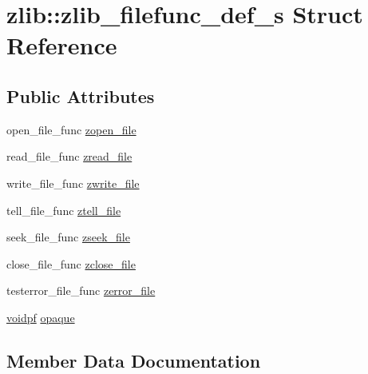\hypertarget{structzlib_1_1zlib__filefunc__def__s}{}\section{zlib\+:\+:zlib\+\_\+filefunc\+\_\+def\+\_\+s Struct Reference}
\label{structzlib_1_1zlib__filefunc__def__s}
\subsection*{Public Attributes}
\begin{DoxyCompactItemize}
\item 
open\+\_\+file\+\_\+func \hyperlink{structzlib_1_1zlib__filefunc__def__s_a86f77bf0dcbca7f7c93eeef0c3dc5e3f}{zopen\+\_\+file}
\item 
read\+\_\+file\+\_\+func \hyperlink{structzlib_1_1zlib__filefunc__def__s_a9711e81c84baecbd5e3cee927d80e9d5}{zread\+\_\+file}
\item 
write\+\_\+file\+\_\+func \hyperlink{structzlib_1_1zlib__filefunc__def__s_a88245281ce2bbc17b64cc53de3b2aa48}{zwrite\+\_\+file}
\item 
tell\+\_\+file\+\_\+func \hyperlink{structzlib_1_1zlib__filefunc__def__s_a415f4021bb24d58c90f975af1c895f5e}{ztell\+\_\+file}
\item 
seek\+\_\+file\+\_\+func \hyperlink{structzlib_1_1zlib__filefunc__def__s_a401a47099ede7b599fa15d5bb6fcf7be}{zseek\+\_\+file}
\item 
close\+\_\+file\+\_\+func \hyperlink{structzlib_1_1zlib__filefunc__def__s_a6f3390ecaead72d856e1a4c34189137c}{zclose\+\_\+file}
\item 
testerror\+\_\+file\+\_\+func \hyperlink{structzlib_1_1zlib__filefunc__def__s_a56fe4b30136ffef281c9619b42cd0919}{zerror\+\_\+file}
\item 
\hyperlink{namespacezlib_a2bc9778594c329ce309c43185bc3f9eb}{voidpf} \hyperlink{structzlib_1_1zlib__filefunc__def__s_a7939d028329be9b332d7f6f9da9165f6}{opaque}
\end{DoxyCompactItemize}


\subsection{Member Data Documentation}
\mbox{\label{structzlib_1_1zlib__filefunc__def__s_a7939d028329be9b332d7f6f9da9165f6}} 
